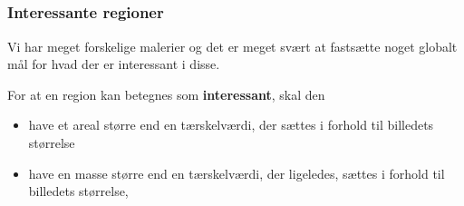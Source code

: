 \documentclass{beamer}
\begin{document}
\subsection*{}
\begin{frame}

    \frametitle{Interessante regioner}

    Vi har meget forskelige malerier og det er meget svært at fastsætte noget globalt mål for
    hvad der er interessant i disse.

    \begin{definition}
        For at en region kan betegnes som \textbf{interessant}, skal den
        \begin{itemize}
            \item have et areal større end en tærskelværdi, der sættes i
                forhold til billedets størrelse
            \item have en masse større end en tærskelværdi, der ligeledes,
                sættes i forhold til billedets størrelse,
        \end{itemize}
    \end{definition}

\end{frame}
\end{document}

